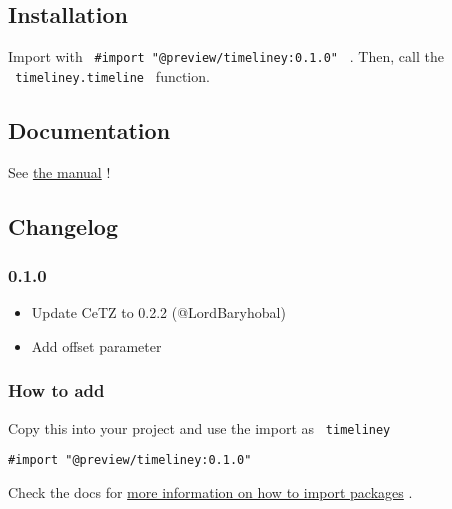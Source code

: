 
\subsection{Installation}\label{installation}

Import with \texttt{\ \#import\ "@preview/timeliney:0.1.0"\ } . Then,
call the \texttt{\ timeliney.timeline\ } function.

\subsection{Documentation}\label{documentation}

See
\href{https://github.com/typst/packages/raw/main/packages/preview/timeliney/0.1.0/manual.pdf}{the
manual} !

\subsection{Changelog}\label{changelog}

\subsubsection{0.1.0}\label{section}

\begin{itemize}
\tightlist
\item
  Update CeTZ to 0.2.2 (@LordBaryhobal)
\item
  Add offset parameter
\end{itemize}

\subsubsection{How to add}\label{how-to-add}

Copy this into your project and use the import as \texttt{\ timeliney\ }

\begin{verbatim}
#import "@preview/timeliney:0.1.0"
\end{verbatim}



Check the docs for
\href{https://typst.app/docs/reference/scripting/\#packages}{more
information on how to import packages} .

